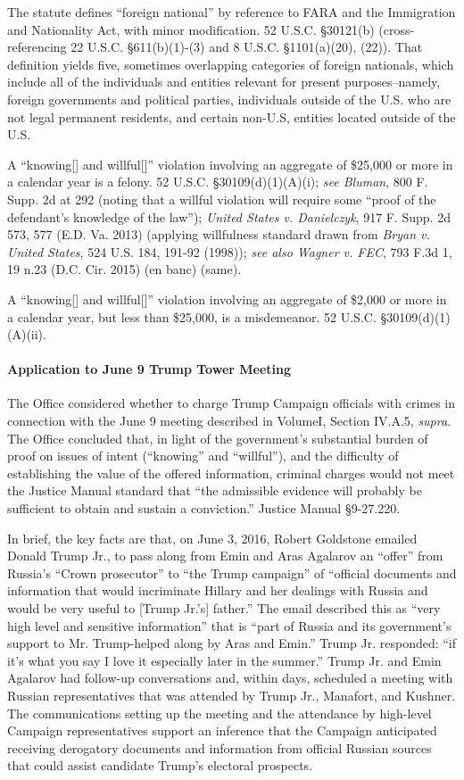 The statute defines ``foreign national'' by reference to FARA and the Immigration and Nationality Act, with minor modification.
52 U.S.C. \S 30121(b) (cross-referencing 22 U.S.C. \S 611(b)(1)-(3) and 8 U.S.C. \S 1101(a)(20), (22)).
That definition yields five, sometimes overlapping categories of foreign nationals, which include all of the individuals and entities relevant for present purposes--namely, foreign governments and political parties, individuals outside of the U.S. who are not legal permanent residents, and certain non-U.S, entities located outside of the U.S.

A ``knowing[] and willful[]'' violation involving an aggregate of \$25,000 or more in a calendar year is a felony.
52 U.S.C. \S 30109(d)(1)(A)(i); \textit{see Bluman}, 800 F. Supp. 2d at 292 (noting that a willful violation will require some ``proof of the defendant's knowledge of the law''); \textit{United States v. Danielczyk}, 917 F. Supp. 2d 573, 577 (E.D. Va. 2013) (applying willfulness standard drawn from \textit{Bryan v. United States}, 524 U.S. 184, 191-92 (1998)); \textit{see also Wagner v. FEC}, 793 F.3d 1, 19 n.23 (D.C. Cir. 2015) (en banc) (same).

A ``knowing[] and willful[]'' violation involving an aggregate of \$2,000 or more in a calendar year, but less than \$25,000, is a misdemeanor.
52 U.S.C. \S 30109(d)(1)(A)(ii).

\paragraph{Application to June 9 Trump Tower Meeting}
The Office considered whether to charge Trump Campaign officials with crimes in connection with the June 9 meeting described in VolumeI, Section IV.A.5, \textit{supra}.
The Office concluded that, in light of the government's substantial burden of proof on issues of intent (``knowing'' and ``willful''), and the difficulty of establishing the value of the offered information, criminal charges would not meet the Justice Manual standard that ``the admissible evidence will probably be sufficient to obtain and sustain a conviction.''
Justice Manual \S 9-27.220.

In brief, the key facts are that, on June 3, 2016, Robert Goldstone emailed Donald Trump Jr., to pass along from Emin and Aras Agalarov an ``offer'' from Russia's ``Crown prosecutor'' to ``the Trump campaign'' of ``official documents and information that would incriminate Hillary and her dealings with Russia and would be very useful to [Trump Jr.'s] father.''
The email described this as ``very high level and sensitive information'' that is ``part of Russia and its government's support to Mr. Trump-helped along by Aras and Emin.''
Trump Jr. responded: ``if it's what you say I love it especially later in the summer.''
Trump Jr. and Emin Agalarov had follow-up conversations and, within days, scheduled a meeting with Russian representatives that was attended by Trump Jr., Manafort, and Kushner.
The communications setting up the meeting and the attendance by high-level Campaign representatives support an inference that the Campaign anticipated receiving derogatory documents and information from official Russian sources that could assist candidate Trump's electoral prospects.

